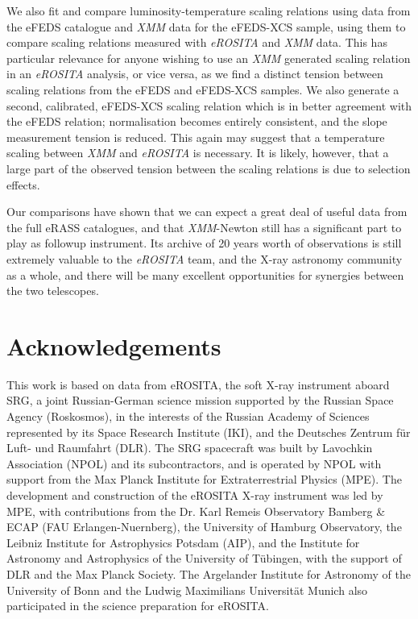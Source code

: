 \documentclass[fleqn,usenatbib]{mnras}
\begin{document}
We also fit and compare luminosity-temperature scaling relations using data from the eFEDS catalogue and {\em XMM} data for the eFEDS-XCS sample, using them to compare scaling relations measured with {\em eROSITA} and {\em XMM} data. This has particular relevance for anyone wishing to use an {\em XMM} generated scaling relation in an {\em eROSITA} analysis, or vice versa, as we find a distinct tension between scaling relations from the eFEDS and eFEDS-XCS samples. We also generate a second, calibrated, eFEDS-XCS scaling relation which is in better agreement with the eFEDS relation; normalisation becomes entirely consistent, and the slope measurement tension is reduced. This again may suggest that a temperature scaling between {\em XMM} and {\em eROSITA} is necessary. It is likely, however, that a large part of the observed tension between the scaling relations is due to selection effects.

Our comparisons have shown that we can expect a great deal of useful data from the full eRASS catalogues, and that {\em XMM}-Newton still has a significant part to play as followup instrument. Its archive of 20 years worth of observations is still extremely valuable to the {\em eROSITA} team, and the X-ray astronomy community as a whole, and there will be many excellent opportunities for synergies between the two telescopes.

\section*{Acknowledgements}
This work is based on data from eROSITA, the soft X-ray instrument aboard SRG, a joint Russian-German science mission supported by the Russian Space Agency (Roskosmos), in the interests of the Russian Academy of Sciences represented by its Space Research Institute (IKI), and the Deutsches Zentrum für Luft- und Raumfahrt (DLR). The SRG spacecraft was built by Lavochkin Association (NPOL) and its subcontractors, and is operated by NPOL with support from the Max Planck Institute for Extraterrestrial Physics (MPE). The development and construction of the eROSITA X-ray instrument was led by MPE, with contributions from the Dr. Karl Remeis Observatory Bamberg \& ECAP (FAU Erlangen-Nuernberg), the University of Hamburg Observatory, the Leibniz Institute for Astrophysics Potsdam (AIP), and the Institute for Astronomy and Astrophysics of the University of Tübingen, with the support of DLR and the Max Planck Society. The Argelander Institute for Astronomy of the University of Bonn and the Ludwig Maximilians Universität Munich also participated in the science preparation for eROSITA.
\end{document}
